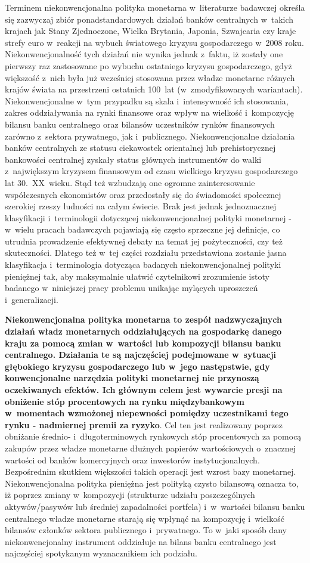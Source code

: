 Terminem niekonwencjonalna polityka monetarna w~literaturze badawczej określa się zazwyczaj zbiór ponadstandardowych działań banków centralnych w~takich krajach jak Stany Zjednoczone, Wielka Brytania, Japonia, Szwajcaria czy kraje strefy euro w~reakcji na wybuch światowego kryzysu gospodarczego w~2008 roku. Niekonwencjonalność tych działań nie wynika jednak z~faktu, iż zostały one pierwszy raz zastosowane po wybuchu ostatniego kryzysu gospodarczego, gdyż większość z~nich była już wcześniej stosowana przez władze monetarne różnych krajów świata na przestrzeni ostatnich 100~lat (w~zmodyfikowanych wariantach). Niekonwencjonalne w~tym przypadku są skala i~intensywność ich stosowania, zakres oddziaływania na rynki finansowe oraz wpływ na wielkość i~kompozycję bilansu banku centralnego oraz bilansów uczestników rynków finansowych zarówno z~sektora prywatnego, jak i~publicznego. Niekonwencjonalne działania banków centralnych ze statusu ciekawostek orientalnej lub prehistorycznej bankowości centralnej zyskały status głównych instrumentów do walki z~największym kryzysem finansowym od czasu wielkiego kryzysu gospodarczego lat 30.~XX~wieku. Stąd też wzbudzają one ogromne zainteresowanie współczesnych ekonomistów oraz przedostały się do świadomości społecznej szerokiej rzeszy ludności na całym świecie. Brak jest jednak jednoznacznej klasyfikacji i~terminologii dotyczącej niekonwencjonalnej polityki monetarnej - w~wielu pracach badawczych pojawiają się często sprzeczne jej definicje, co utrudnia prowadzenie efektywnej debaty na temat jej pożyteczności, czy też skuteczności. Dlatego też w~tej części rozdziału przedstawiona zostanie jasna klasyfikacja i~terminologia dotycząca badanych niekonwencjonalnej polityki pieniężnej tak, aby maksymalnie ułatwić czytelnikowi zrozumienie istoty badanego w~niniejszej pracy problemu unikając mylących uproszczeń i~generalizacji.

\textbf{Niekonwencjonalna polityka monetarna to zespół nadzwyczajnych działań władz monetarnych oddziałujących na gospodarkę danego kraju za pomocą zmian w~wartości lub kompozycji bilansu banku centralnego. Działania te są najczęściej podejmowane w~sytuacji głębokiego kryzysu gospodarczego lub w~jego następstwie, gdy konwencjonalne narzędzia polityki monetarnej nie przynoszą oczekiwanych efektów. Ich głównym celem jest wywarcie presji na obniżenie stóp procentowych na rynku międzybankowym w~momentach wzmożonej niepewności pomiędzy uczestnikami tego rynku - nadmiernej premii za ryzyko}. Cel ten jest realizowany poprzez obniżanie średnio- i~długoterminowych rynkowych stóp procentowych za pomocą zakupów przez władze monetarne dłużnych papierów wartościowych o~znacznej wartości od banków komercyjnych oraz inwestorów instytucjonalnych. Bezpośrednim skutkiem większości takich operacji jest wzrost bazy monetarnej. Niekonwencjonalna polityka pieniężna jest polityką czysto bilansową oznacza to, iż poprzez zmiany w~kompozycji (strukturze udziału poszczególnych aktywów/pasywów lub średniej zapadalności portfela) i~w~wartości bilansu banku centralnego władze monetarne starają się wpłynąć na kompozycję i~wielkość bilansów członków sektora publicznego i~prywatnego. To w~jaki sposób dany niekonwencjonalny instrument oddziałuje na bilans banku centralnego jest najczęściej spotykanym wyznacznikiem ich podziału.

